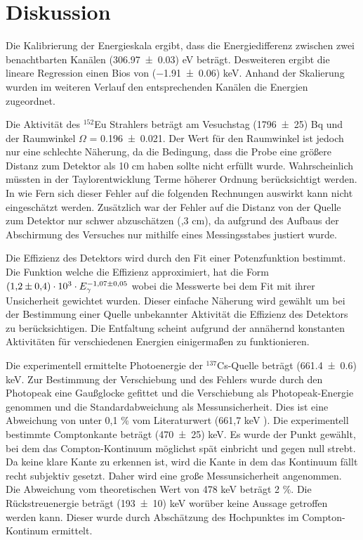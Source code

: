 \section{Diskussion}
\label{sec:Diskussion}
Die Kalibrierung der Energieskala ergibt, dass die Energiedifferenz zwischen zwei benachtbarten Kanälen (\num{306,97 +- 0,03}) eV beträgt. Desweiteren ergibt die lineare Regression einen Bios von (\num{-1,91 +- 0.06}) keV. Anhand der Skalierung wurden im weiteren Verlauf den entsprechenden Kanälen die Energien zugeordnet.

Die Aktivität des $^{152}$Eu Strahlers beträgt am Vesuchstag (\num{1796 +- 25}) Bq und der Raumwinkel $\Omega$ = \num{0,196 +- 0,021}. Der Wert für den Raumwinkel ist jedoch nur eine schlechte Näherung, da die Bedingung, dass die Probe eine größere Distanz zum Detektor als 10 cm haben sollte nicht erfüllt wurde. Wahrscheinlich müssten in der Taylorentwicklung Terme höherer Ordnung berücksichtigt werden. In wie Fern sich dieser Fehler auf die folgenden Rechnungen auswirkt kann nicht eingeschätzt werden. Zusätzlich war der Fehler auf die Distanz von der Quelle zum Detektor nur schwer abzuschätzen (,3 cm), da aufgrund des Aufbaus der Abschirmung des Versuches nur mithilfe eines Messingsstabes justiert wurde.

Die Effizienz des Detektors wird durch den Fit einer Potenzfunktion bestimmt. Die Funktion welche die Effizienz approximiert, hat die Form $(\num{1,2 +- 0,4}) \cdot 10^3 \cdot E_\gamma^{\num{-1,07 +- 0,05}}$ wobei die Messwerte bei dem Fit mit ihrer Unsicherheit gewichtet wurden. Dieser einfache Näherung wird gewählt um bei der Bestimmung einer Quelle unbekannter Aktivität die Effizienz des Detektors zu berücksichtigen. Die Entfaltung scheint aufgrund der annähernd konstanten Aktivitäten für verschiedenen Energien einigermaßen zu funktionieren.

Die experimentell ermittelte Photoenergie der $^{137}$Cs-Quelle beträgt (\num{661,4 +- 0,6}) keV. Zur Bestimmung der Verschiebung und des Fehlers wurde durch den Photopeak eine Gaußglocke gefittet und die Verschiebung als Photopeak-Energie genommen und die Standardabweichung als Messunsicherheit. Dies ist eine Abweichung von unter 0,1 \% vom Literaturwert (661,7 keV \cite{Cs}). Die experimentell bestimmte Comptonkante beträgt (\num{470+- 25}) keV. Es wurde der Punkt gewählt, bei dem das Compton-Kontinuum möglichst spät einbricht und gegen null strebt. Da keine klare Kante zu erkennen ist, wird die Kante in dem das Kontinuum fällt recht subjektiv gesetzt. Daher wird eine große Messunsicherheit angenommen. Die Abweichung vom theoretischen Wert von 478 keV beträgt 2 \%. Die Rückstreuenergie beträgt (\num{193+- 10}) keV worüber keine Aussage getroffen werden kann. Dieser wurde durch Abschätzung des Hochpunktes im Compton-Kontinum ermittelt.

